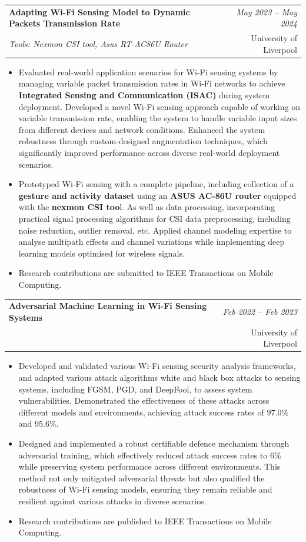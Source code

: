 \documentclass[a4paper,11pt]{article}
\makeatletter
\newcommand{\resumeProject}[4]{
\vspace{0.5mm}\item
    \begin{tabular*}{0.98\textwidth}[t]{l@{\extracolsep{\fill}}r}
        \textbf{#1} & \textit{\footnotesize{#3}} \\
        \footnotesize{\textit{#2}} & \footnotesize{#4}
    \end{tabular*}
    \vspace{-2.4mm}
}
\newcommand{\resumeItemListStart}{\begin{itemize}[leftmargin=*,labelsep=1mm,itemsep=0.5mm]}
\newcommand{\resumeItemListEnd}{\end{itemize}\vspace{-2mm}}
\makeatother
\begin{document}
\resumeProject
{Adapting Wi-Fi Sensing Model to Dynamic Packets Transmission Rate }{Tools: Nexmon CSI tool, Asus RT-AC86U Router}{May 2023 – May 2024}{University of Liverpool}
\resumeItemListStart
\item Evaluated real-world application scenarios for Wi-Fi sensing systems by managing variable packet transmission rates in Wi-Fi networks to achieve \textbf{Integrated Sensing and Communication (ISAC)} during system deployment. Developed a novel Wi-Fi sensing approach capable of working on variable transmission rate, enabling the system to handle variable input sizes from different devices and network conditions. Enhanced the system robustness through custom-designed augmentation techniques, which significantly improved performance across diverse real-world deployment scenarios.
    \item Prototyped Wi-Fi sensing with a complete pipeline, including collection of a \textbf{{gesture and activity dataset}} using an \textbf{{ASUS AC-86U router}} equipped with the \textbf{{nexmon CSI too}}l. As well as  data processing, incorporating practical signal processing algorithms for CSI data preprocessing, including noise reduction, outlier removal, etc. Applied channel modeling expertise to analyse multipath effects and channel variations while implementing deep learning models optimised for wireless signals.


    
        \item Research contributions are submitted to IEEE Transactions on Mobile Computing.
\resumeItemListEnd

\resumeProject
  {Adversarial Machine Learning in Wi-Fi Sensing Systems}
  {}
  {Feb 2022 -- Feb 2023}
  {University of Liverpool}
\resumeItemListStart
       \item Developed and validated various Wi-Fi sensing security analysis frameworks, and adapted various attack algorithms white and black box attacks to sensing systems, including FGSM, PGD, and DeepFool, to assess system vulnerabilities. Demonstrated the effectiveness of these attacks across different models and environments, achieving attack success rates of $97.0\%$ and $95.6\%$. 
        \item Designed and implemented a robust certifiable defence mechanism through adversarial training, which effectively reduced attack success rates to 6\% while preserving system performance across different environments. This method not only mitigated adversarial threats but also qualified the robustness of Wi-Fi sensing models, ensuring they remain reliable and resilient against various attacks in diverse scenarios.
        \item Research contributions are published to IEEE Transactions on Mobile Computing.
\resumeItemListEnd
\end{document}
